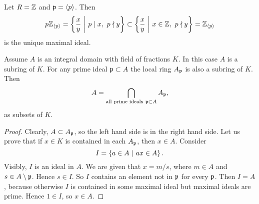 \begin{example}
Let $ R = \mathbb{Z} $ and $ \mathfrak{p} = \left\langle p \right\rangle $. Then
$$ p\ZZ_{\abr{p}} = \cbr{\dfrac{x}{y} \st p \mid x, \ p \nmid y} \subset \cbr{\dfrac{x}{y} \st x \in \ZZ, \ p \nmid y} = \ZZ_{\abr{p}} $$
is the unique maximal ideal.
\end{example}

\begin{corollary}
Assume $ A $ is an integral domain with field of fractions $ K $. In this case $ A $ is a subring of $ K $. For any prime ideal $ \mathfrak{p} \subset A $ the local ring $ A_{\mathfrak{p}} $ is also a subring of $ K $. Then
$$ A = \bigcap_{\text{all prime ideals} \ \ppp \subset A} A_\ppp, $$
as subsets of $ K $.
\end{corollary}

\begin{proof}
Clearly, $ A \subset A_{\mathfrak{p}} $, so the left hand side is in the right hand side. Let us prove that if $ x \in K $ is contained in each $ A_{\mathfrak{p}} $, then $ x \in A $. Consider
$$ I = \cbr{a \in A \st ax \in A}. $$
Visibly, $ I $ is an ideal in $ A $. We are given that $ x = m / s $, where $ m \in A $ and $ s \in A \setminus \mathfrak{p} $. Hence $ s \in I $. So $ I $ contains an element not in $ \mathfrak{p} $ for every $ \mathfrak{p} $. Then $ I = A $, because otherwise $ I $ is contained in some maximal ideal but maximal ideals are prime. Hence $ 1 \in I $, so $ x \in A $.
\end{proof}


